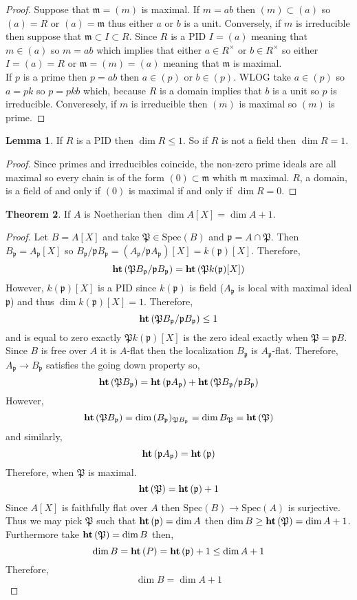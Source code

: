 \documentclass[12pt]{article}
\newcommand{\Spec}[1]{\mathrm{Spec}\left( #1 \right)}
\newcommand{\p}{\mathfrak{p}}
\renewcommand{\P}{\mathfrak{P}}
\newcommand{\m}{\mathfrak{m}}
\theoremstyle{remark}
\theoremstyle{definition}
\newtheorem{theorem}{Theorem}[section]
\newtheorem{lemma}[theorem]{Lemma}
\begin{document}
\begin{proof}
Suppose that $\m = (m)$ is maximal. If $m = ab$ then $(m) \subset (a)$ so $(a) = R$ or $(a) = \m$ thus either $a$ or $b$ is a unit. Conversely, if $m$ is irreducible then suppose that $\m \subset I \subset R$. Since $R$ is a PID $I = (a)$ meaning that $m \in (a)$ so $m = ab$ which implies that either $a \in R^\times$ or $b \in R^\times$ so either $I = (a) = R$ or $\m = (m) = (a)$ meaning that $\m$ is maximal. 
\bigskip\\
If $p$ is a prime then $p = ab$ then $a \in (p)$ or $b \in (p)$. WLOG take $a \in (p)$ so $a = pk$ so $p = pkb$ which, because $R$ is a domain implies that $b$ is a unit so $p$ is irreducible. Converesely, if $m$ is irreducible then $(m)$ is maximal so $(m)$ is prime. 
\end{proof}

\begin{lemma}
If $R$ is a PID then $\dim{R} \le 1$. So if $R$ is not a field then $\dim{R} = 1$. 
\end{lemma}

\begin{proof}
Since primes and irreducibles coincide, the non-zero prime ideals are all maximal so every chain is of the form $(0) \subset \m$ whith $\m$ maximal. $R$, a domain, is a field of and only if $(0)$ is maximal if and only if $\dim{R} = 0$.   
\end{proof}

\begin{theorem}
If $A$ is Noetherian then $\dim{A[X]} = \dim{A} + 1$.
\end{theorem}

\begin{proof}
Let $B = A[X]$ and take $\P \in \Spec{B}$ and $\p = A \cap \P$. Then $B_{\p} = A_\p[X]$ so $B_\p / \p B_\p = (A_\p/\p A_\p)[X] = k(\p)[X]$. Therefore,
\[ 
\height{\P B_\p / \p B_\p} = \height{\P k(\p)[X]}
\]
However, $k(\p)[X]$ is a PID since $k(\p)$ is field ($A_\p$ is local with maximal ideal $\p$) and thus $\dim{k(\p)[X]} = 1$. Therefore,
\[ \height{\P B_\p / \p B_\p} \le 1 \]
and is equal to zero exactly $\P k(\p)[X]$ is the zero ideal exactly when $\P = \p B$. Since $B$ is free over $A$ it is $A$-flat then the localization $B_\p$ is $A_\p$-flat. Therefore, $A_\p \to B_\p$ satisfies the going down property so,
\[ \height{\P B_\p} = \height{\p A_\p} + \height{\P B_\p / \p B_\p} \]
However,
\[ \height{\P B_\p} = \dim{(B_\p)_{\P B_\p}} = \dim{B_\P} = \height{\P} \]
and similarly,
\[ \height{\p A_\p} = \height{\p} \]
Therefore, when $\P$ is maximal.
\[ \height{\P} = \height{\p} + 1 \]
Since $A[X]$ is faithfully flat over $A$ then $\Spec{B} \to \Spec{A}$ is surjective. Thus we may
pick $\P$ such that $\height{\p} = \dim{A}$ then 
$\dim{B} \ge \height{\P} = \dim{A} + 1$. 
Furthermore take $\height{\P} = \dim{B}$ then,
\[ \dim{B} = \height{P} = \height{\p} + 1 \le \dim{A} + 1 \]
Therefore,
\[ \dim{B} = \dim{A} + 1 \]
\end{proof}
\end{document}
